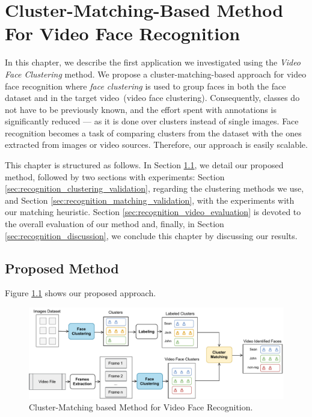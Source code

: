 \newpage
\chapter{Cluster-Matching-Based Method For Video Face Recognition}
\label{chap:face_recognition}

In this chapter, we describe the first application we investigated using the \emph{Video Face Clustering} method.
We propose a cluster-matching-based approach for video face recognition where \emph{face clustering} is used to group faces in both the face dataset and in the target video~(video face clustering).
Consequently, classes do not have to be previously known, and the effort spent with annotations is significantly reduced --- as it is done over clusters instead of single images.
Face recognition becomes a task of comparing clusters from the dataset with the ones extracted from images or video sources.
Therefore, our approach is easily scalable.

This chapter is structured as follows. In Section \ref{sec:recognition_method}, we detail our proposed method, followed by two sections with experiments: 
Section \ref{sec:recognition_clustering_validation}, regarding the clustering methods we use, and 
Section \ref{sec:recognition_matching_validation}, with the experiments with our matching heuristic.
Section \ref{sec:recognition_video_evaluation} is devoted to the overall evaluation of our method and, finally, 
in Section \ref{sec:recognition_discussion}, we conclude this chapter by discussing our results.

\section{Proposed Method}
\label{sec:recognition_method}


Figure \ref{fig:cluster_matching} shows our proposed approach.

\begin{figure}[!ht]
    \centering
    \includegraphics[width=\textwidth]{img/face_clustering/cluster_matching_process.pdf}
    \caption{Cluster-Matching based Method for Video Face Recognition.}
    \label{fig:cluster_matching}
\end{figure}

